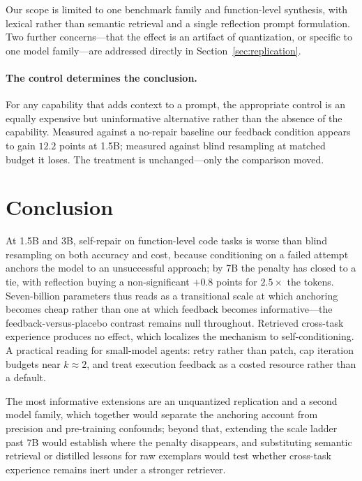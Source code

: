 Our scope is limited to one benchmark family and function-level synthesis,
with lexical rather than semantic retrieval and a single reflection prompt
formulation. Two further concerns---that the effect is an artifact of
quantization, or specific to one model family---are addressed directly in
Section~\ref{sec:replication}.

\paragraph{The control determines the conclusion.}
For any capability that adds context to a prompt, the appropriate control is an
equally expensive but uninformative alternative rather than the absence of the
capability. Measured against a no-repair baseline our feedback condition appears
to gain $12.2$ points at 1.5B; measured against blind resampling at matched
budget it loses. The treatment is unchanged---only the comparison moved.

\section{Conclusion}
\label{sec:conclusion}

At 1.5B and 3B, self-repair on function-level code tasks is worse than blind
resampling on both accuracy and cost, because conditioning on a failed attempt
anchors the model to an unsuccessful approach; by 7B the penalty has closed to
a tie, with reflection buying a non-significant $+0.8$ points for
$2.5\times$ the tokens. Seven-billion parameters thus reads as a transitional
scale at which anchoring becomes cheap rather than one at which feedback
becomes informative---the feedback-versus-placebo contrast remains null
throughout. Retrieved cross-task experience produces no effect, which localizes
the mechanism to self-conditioning. A practical reading for small-model agents:
retry rather than patch, cap iteration budgets near $k{\approx}2$, and treat
execution feedback as a costed resource rather than a default.

The most informative extensions are an unquantized replication and a second
model family, which together would separate the anchoring account from
precision and pre-training confounds; beyond that, extending the scale ladder
past 7B would establish where the penalty disappears, and substituting semantic
retrieval or distilled lessons for raw exemplars would test whether cross-task
experience remains inert under a stronger retriever.
